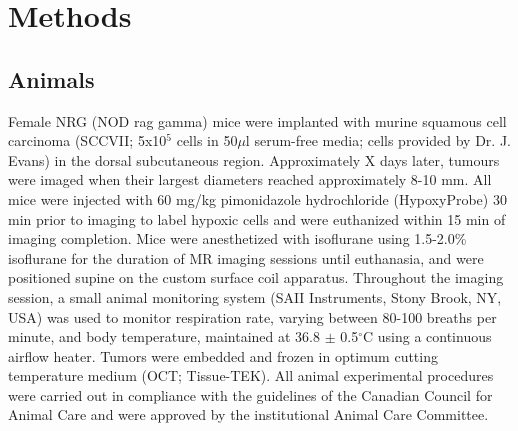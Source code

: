 \documentclass[num-refs]{wiley-article}
\begin{document}
\section{Methods}
\subsection{Animals}
Female NRG (NOD rag gamma) mice were implanted with murine squamous cell carcinoma (SCCVII; 5x10$^5$ cells in 50$\mu$l serum-free media; cells provided by Dr. J. Evans) in the dorsal subcutaneous region.
Approximately X  days later, tumours were imaged when their largest diameters reached approximately 8-10 mm.
All mice were injected with 60 mg/kg pimonidazole hydrochloride (HypoxyProbe) 30 min prior to imaging to label hypoxic cells and were euthanized within 15 min of imaging completion.
Mice were anesthetized with isoflurane using 1.5-2.0\% isoflurane for the duration of MR imaging sessions until euthanasia, and were positioned supine on the custom surface coil apparatus.
Throughout the imaging session, a small animal monitoring system (SAII Instruments, Stony Brook, NY, USA) was used to monitor respiration rate, varying between 80-100 breaths per minute, and body temperature, maintained at 36.8 $\pm$ 0.5$^\circ$C using a continuous airflow heater. 
Tumors were embedded and frozen in optimum cutting temperature medium (OCT; Tissue-TEK).
All animal experimental procedures were carried out in compliance with the guidelines of the Canadian Council for Animal Care and were approved by the institutional Animal Care Committee.
\end{document}
